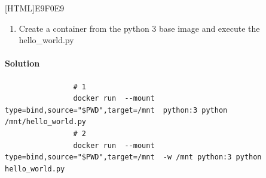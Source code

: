 \documentclass[12pt]{article}
\begin{document}
		{E9F0E9}{\parbox{\linewidth}{%
				\begin{enumerate}
					\item Create a container from the python 3 base image and execute the hello\_world.py
				\end{enumerate}
		}}
		
		\paragraph{Solution}	
		
		\begin{minipage}{\linewidth}
			\begin{lstlisting}
				# 1
				docker run  --mount type=bind,source="$PWD",target=/mnt  python:3 python /mnt/hello_world.py
				# 2
				docker run  --mount type=bind,source="$PWD",target=/mnt  -w /mnt python:3 python hello_world.py
			\end{lstlisting}
		\end{minipage}
	
	
\end{document}
